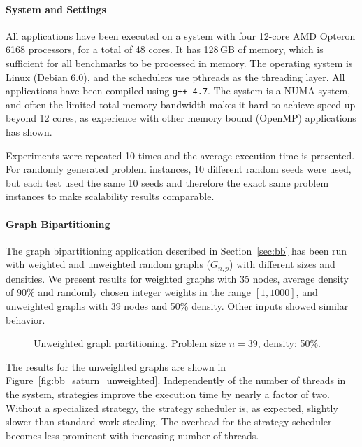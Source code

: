 \documentclass[a4paper,11pt]{article}
\begin{document}
\paragraph{System and Settings}

All applications have been executed on a system with four 12-core AMD
Opteron 6168 processors, for a total of 48 cores. It has 128\,GB of
memory, which is sufficient for all benchmarks to be processed in
memory.  The operating system is Linux (Debian 6.0), and the
schedulers use pthreads as the threading layer. All applications have
been compiled using \texttt{g++ 4.7}. The system is a NUMA system, and
often the limited total memory bandwidth makes it hard to achieve
speed-up beyond 12 cores, as experience with other memory bound
(OpenMP) applications has shown.

Experiments were repeated 10 times and the average execution time is
presented. For randomly generated problem instances, 10 different
random seeds were used, but each test used the same 10 seeds and
therefore the exact same problem instances to make scalability results
comparable.

\paragraph{Graph Bipartitioning}
\label{sec:results_bb}

The graph bipartitioning application described in Section~\ref{sec:bb}
has been run with weighted and unweighted random graphs ($G_{n,p}$)
with different sizes and densities. We present results for weighted
graphs with 35 nodes, average density of 90\% and randomly chosen
integer weights in the range $[1,1000]$, and unweighted graphs with 39
nodes and 50\% density. Other inputs showed similar behavior.

\begin{figure}
\centering
{}
\caption{Unweighted graph partitioning. Problem size $n=39$, density: 50\%.}
\end{figure}

The results for the unweighted graphs are shown in
Figure~\ref{fig:bb_saturn_unweighted}.  Independently of the number of
threads in the system, strategies improve the execution time by nearly
a factor of two. Without a specialized strategy, the strategy
scheduler is, as expected, slightly slower than standard
work-stealing.  The overhead for the strategy scheduler becomes less
prominent with increasing number of threads.
\end{document}
